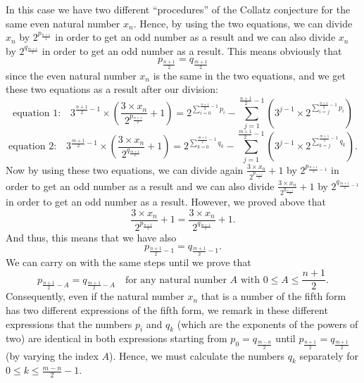 \documentclass[11pt,a4paper]{article}
\theoremstyle{definition}
\begin{document}
In this case we have two different ``procedures'' of the Collatz conjecture for the same
even natural number $x_n$. Hence, by using the two equations, we can divide $x_n$ by
$2^{p_{\frac{n+1}{2}}}$ in order to get an odd number as a result and we can also divide
$x_n$ by $2^{q_{\frac{m+1}{2}}}$ in order to get an odd number as a result. This means
obviously that
\begin{equation}
p_{\frac{n+1}{2}}=q_{\frac{m+1}{2}}
\end{equation}
since the even natural number $x_n$ is the same in the two equations, and we get these two
equations as a result after our division:
\begin{equation}
\text{equation 1:}\quad
3^{\frac{n+1}{2}-1}\times\left(\frac{3\times x_n}{2^{p_{\frac{n+1}{2}}}}+1\right)
=2^{\sum_{i=0}^{\frac{n+1}{2}-1}p_i}-\sum_{j=1}^{\frac{n+1}{2}-1}\left(3^{j-1}\times 2^{\sum_{i=j}^{\frac{n+1}{2}-1}p_i}\right)
\end{equation}
\begin{equation}
\text{equation 2:}\quad
3^{\frac{m+1}{2}-1}\times\left(\frac{3\times x_n}{2^{q_{\frac{m+1}{2}}}}+1\right)
=2^{\sum_{k=0}^{\frac{m+1}{2}-1}q_k}-\sum_{j=1}^{\frac{m+1}{2}-1}\left(3^{j-1}\times 2^{\sum_{k=j}^{\frac{m+1}{2}-1}q_k}\right).
\end{equation}
Now by using these two equations, we can divide again
$\frac{3\times x_n}{2^{p_{\frac{n+1}{2}}}}+1$ by $2^{p_{\frac{n+1}{2}-1}}$ in order to get
an odd number as a result and we can also divide
$\frac{3\times x_n}{2^{q_{\frac{m+1}{2}}}}+1$ by $2^{q_{\frac{m+1}{2}-1}}$ in order to get
an odd number as a result. However, we proved above that
\begin{equation}
\frac{3\times x_n}{2^{p_{\frac{n+1}{2}}}}+1=\frac{3\times x_n}{2^{q_{\frac{m+1}{2}}}}+1.
\end{equation}
And thus, this means that we have also
\begin{equation}
p_{\frac{n+1}{2}-1}=q_{\frac{m+1}{2}-1}.
\end{equation}
We can carry on with the same steps until we prove that
\begin{equation}
p_{\frac{n+1}{2}-A}=q_{\frac{m+1}{2}-A}\quad\text{for any natural number }A\text{ with }0\le A\le\frac{n+1}{2}.
\end{equation}
Consequently, even if the natural number $x_n$ that is a number of the fifth form has two
different expressions of the fifth form, we remark in these different expressions that the
numbers $p_i$ and $q_k$ (which are the exponents of the powers of two) are identical in both
expressions starting from $p_0=q_{\frac{m-n}{2}}$ until $p_{\frac{n+1}{2}}=q_{\frac{m+1}{2}}$
(by varying the index $A$). Hence, we must calculate the numbers $q_k$ separately for
$0\le k\le\frac{m-n}{2}-1$.
\end{document}
